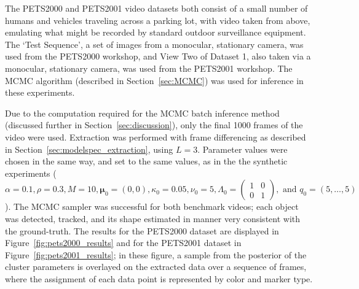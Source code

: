 \documentclass[smallcondensed, final]{svjour3}
\begin{document}
The PETS2000 and PETS2001 video datasets both consist of a small number of humans and vehicles traveling across a parking lot, with video taken from above, emulating what might be recorded by standard outdoor surveillance equipment. The `Test Sequence', a set of images from a monocular, stationary camera, was used from the PETS2000 workshop, and View Two of Dataset 1, also taken via a monocular, stationary camera, was used from the PETS2001 workshop. The MCMC algorithm (described in Section~\ref{sec:MCMC}) was used for inference in these experiments.

Due to the computation required for the MCMC batch inference method (discussed further in Section~\ref{sec:discussion}), only the final 1000 frames of the video were used. Extraction was performed with frame differencing as described in Section~\ref{sec:modelspec_extraction}, using $L=3$. Parameter values were chosen in the same way, and set to the same values, as in the the synthetic experiments ($\alpha = 0.1, \rho = 0.3, M = 10, \boldsymbol{\mu}_{0} = (0,0), \kappa_{0} = 0.05, \nu_{0} = 5, \Lambda_{0} = \left( \begin{smallmatrix} 1&0\\ 0&1 \end{smallmatrix} \right), \text{ and } q_{0} = (5, \ldots, 5)$). The MCMC sampler was successful for both benchmark videos; each object was detected, tracked, and its shape estimated in manner very consistent with the ground-truth. The results for the PETS2000 dataset are displayed in Figure~\ref{fig:pets2000_results} and for the PETS2001 dataset in Figure~\ref{fig:pets2001_results}; in these figure, a sample from the posterior of the cluster parameters is overlayed on the extracted data over a sequence of frames, where the assignment of each data point is represented by color and marker type.
\end{document}
